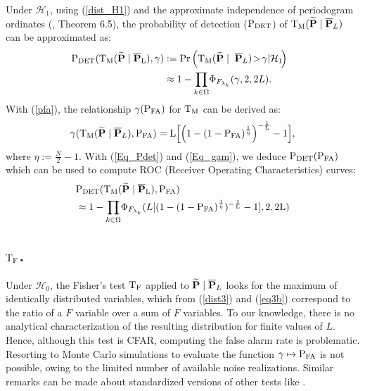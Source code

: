 \documentclass[journal]{IEEEtran}
\begin{document}
 Under ${\mathcal{H}_1}$, using (\ref{dist_H1}) and the approximate independence of periodogram ordinates (\cite{Li_2014}, Theorem 6.5), the probability of detection ($\rm{P_{DET}}$) of ${\rm T_M} ({\bf \widetilde{\bf P}}\;|\;\overline{\bf P}_L)$ can be  approximated as: 
   \begin{equation} 
  \begin{aligned} 
	\!\!\!\!\rm{P_{DET}}({{\rm T_M}} ({\bf \widetilde{\bf P}}\;|\;\overline{\bf P}_L) ,\gamma)&:=  \textrm{Pr} \left({\rm T_M}({\bf \widetilde{\bf P}}\;|\;\;\overline{\bf P}_L)\! > \!\gamma | {\cal{H}}_1\! \right) \\
	&\approx 1 - \displaystyle{ \prod_{k \in \Omega}} \Phi_{F_{\lambda_k}}(\gamma, 2,2L).
	\end{aligned}
		\label{Eq_Pdet}
\end{equation}	
With (\ref{pfa}),  the relationship $\gamma(\rm{P_{FA}})$ for ${{\rm T_M}}$ can be derived as:
 \begin{equation} 
\label{Eq_gam}
		\gamma({{\rm T_M} ({\bf \widetilde{\bf P}}\;|\;\overline{\bf P}_L}),\rm{P_{FA}}) =  L  \Big[ \Big( 1 - ( 1 - \rm{P_{FA}})^{\frac{1}{\eta}} \Big)^{-\frac{1}{L}} -1 \Big],   
\end{equation}	
{where $\eta := \frac{N}{2}-1$}. With (\ref{Eq_Pdet}) and (\ref{Eq_gam}), we  deduce $\rm{P_{DET}(P_{FA})}$ which can be used to compute ROC (Receiver Operating Characteristics) curves:
 \begin{equation} 
   \begin{aligned} 
\label{Eq20}
	&{\rm{P_{DET}}({{\rm T_M}} ({\bf \widetilde{\bf P}}\;|\;\overline{\bf P}_L)},{\rm{P_{FA}}})  \\
	&\approx 1 - \displaystyle{ \prod_{k\in \Omega }}  \Phi_{F_{\lambda_k}}(L  [ ( 1 - ( 1 - \rm{P_{FA}})^{\frac{1}{\eta}} )^{-\frac{1}{L}} -1 ],2,2L)
		\end{aligned}
\end{equation}	
 
 \subsection{${\rm T_F}$.}
 \label{fisher}
{ Under $\mathcal{H}_0$,} the Fisher's test ${\rm T_F}$ applied to  ${\bf \widetilde{\bf P}}\;|\;\overline{\bf P}_L$ looks for the maximum of identically distributed variables, which from  (\ref{dist3}) and (\ref{eq3b})
{ correspond to the} ratio  of a $F$ variable over a sum of $F$ variables. To our knowledge, there is no { analytical} characterization of the resulting distribution
{ for finite values of $L$. }
Hence, although this test is CFAR, { computing} the false alarm rate is problematic. Resorting to Monte Carlo simulations to evaluate the function $\gamma \mapsto \rm{{P}_{FA}}$ is not possible, owing to the limited number of available noise realizations.
 Similar remarks can be made about standardized versions of other tests like \cite{Shimshoni_1971, Siegel_1980,Chiu_1989}.
\end{document}
